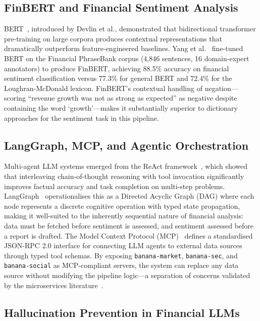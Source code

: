 \documentclass[10pt,twocolumn]{article}
\newcommand{\node}[1]{\texttt{#1}}
\begin{document}
\subsection{FinBERT and Financial Sentiment Analysis}

BERT~\cite{devlin2019bert}, introduced by Devlin et al., demonstrated
that bidirectional transformer pre-training on large corpora produces
contextual representations that dramatically outperform
feature-engineered baselines.
Yang et al.~\cite{yang2020finbert} fine-tuned BERT on the Financial
PhraseBank corpus (4,846 sentences, 16 domain-expert annotators) to
produce FinBERT, achieving 88.5\% accuracy on financial sentiment
classification versus 77.3\% for general BERT and 72.4\% for the
Loughran-McDonald lexicon.
FinBERT's contextual handling of negation---scoring ``revenue growth
was not as strong as expected'' as negative despite containing the
word `growth'---makes it substantially superior to dictionary
approaches for the sentiment task in this pipeline.

\subsection{LangGraph, MCP, and Agentic Orchestration}

Multi-agent LLM systems emerged from the ReAct
framework~\cite{yao2023react}, which showed that interleaving
chain-of-thought reasoning with tool invocation significantly improves
factual accuracy and task completion on multi-step problems.
LangGraph~\cite{langgraph2023} operationalises this as a Directed
Acyclic Graph (DAG) where each node represents a discrete cognitive
operation with typed state propagation, making it well-suited to the
inherently sequential nature of financial analysis: data must be
fetched before sentiment is assessed, and sentiment assessed before
a report is drafted.
The Model Context Protocol (MCP)~\cite{mcp2024} defines a
standardised JSON-RPC 2.0 interface for connecting LLM agents to
external data sources through typed tool schemas.
By exposing \node{banana-market}, \node{banana-sec}, and
\node{banana-social} as MCP-compliant servers, the system can replace
any data source without modifying the pipeline logic---a separation of
concerns validated by the microservices literature~\cite{newman2015}.

\subsection{Hallucination Prevention in Financial LLMs}
\end{document}
